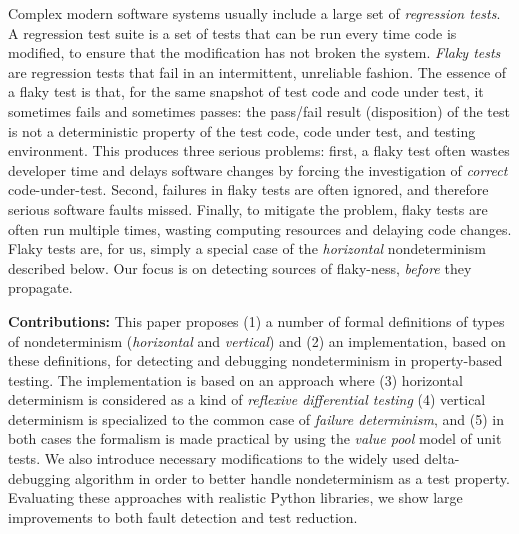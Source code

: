 Complex
modern software systems usually include a large set of
\emph{regression tests}.  A regression test suite is a
set of tests that can be run every time code
is modified, to ensure that the modification has not broken the system.  \emph{Flaky tests} \cite{miccoflaky} are regression
tests that fail in an intermittent, unreliable fashion.  The essence of a flaky
test is that, for the same snapshot of test code and code under test, it sometimes fails and sometimes passes: the pass/fail result (disposition) of the
test is not a deterministic property of the test code, code under
test, and testing environment.  This produces three serious
problems: first, a flaky test often wastes developer time and delays
software changes by forcing the investigation of \emph{correct} code-under-test.  Second, failures in flaky tests are often ignored, and therefore serious software faults missed.  Finally, to mitigate the problem, flaky tests are often
run multiple times, wasting computing resources and
delaying code changes.  Flaky tests are, for us, simply a special case
of the 
\emph{horizontal} nondeterminism 
described below.  Our focus is on detecting sources of 
flaky-ness, \emph{before} they propagate.
\begin{comment}
  As an analogy, we note that  a canary in a coal mine is of
little use if canaries frequently become ill for reasons unrelated to
the presence of toxic gases.  Mining may stop for no good reason, or
miners may learn to ignore the canary, leading to tragedy; a third,
more ``practical'' option is that miners may carry so many redundant
canaries into the coal mine that canary-care itself becomes a serious burden.
\end{comment}





{\bf Contributions:} This paper proposes (1) a number of formal definitions of types of
nondeterminism (\emph{horizontal} and \emph{vertical}) and (2) an implementation, based on these definitions, for detecting and debugging
nondeterminism in property-based testing.  The implementation is based
on an approach where (3) horizontal determinism is considered as a
kind of \emph{reflexive differential testing} (4) vertical
determinism is specialized to the common case of \emph{failure
  determinism}, and (5)  in both cases the formalism is made practical
by using the \emph{value pool} model of unit tests.
We also introduce necessary modifications to the widely used delta-debugging algorithm in order to better handle
nondeterminism as a test property.  Evaluating these approaches with
realistic Python libraries, we show large improvements to both fault
detection and test reduction.

